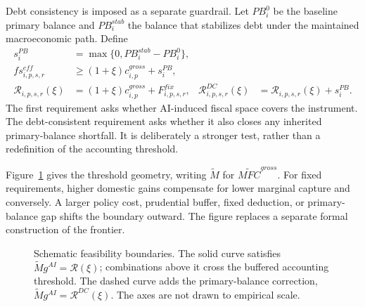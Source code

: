 Debt consistency is imposed as a separate guardrail. Let $PB_i^0$ be the baseline primary balance and $PB_i^{stab}$ the balance that stabilizes debt under the maintained macroeconomic path. Define
\begin{align}
  s_i^{PB}
    &=\max\{0,PB_i^{stab}-PB_i^0\},
    \label{eq:primary_balance_gap_clean}\\
  fs^{eff}_{i,p,s,r}
    &\geq(1+\xi)c^{gross}_{i,p}+s_i^{PB},
    \label{eq:debt_guardrail_clean}\\
  \mathcal R_{i,p,s,r}(\xi)
    &=(1+\xi)c^{gross}_{i,p}+F^{fix}_{i,p,s,r},
  &\mathcal R^{DC}_{i,p,s,r}(\xi)
    &=\mathcal R_{i,p,s,r}(\xi)+s_i^{PB}.
    \label{eq:requirements_clean}
\end{align}
The first requirement asks whether AI-induced fiscal space covers the instrument. The debt-consistent requirement asks whether it also closes any inherited primary-balance shortfall. It is deliberately a stronger test, rather than a redefinition of the accounting threshold.

Figure~\ref{fig:frontier_clean} gives the threshold geometry, writing $\widetilde M$ for $\widetilde{MFC}^{gross}$. For fixed requirements, higher domestic gains compensate for lower marginal capture and conversely. A larger policy cost, prudential buffer, fixed deduction, or primary-balance gap shifts the boundary outward. The figure replaces a separate formal construction of the frontier.

\begin{figure}[H]
\centering
{}
\caption{Schematic feasibility boundaries. The solid curve satisfies
$\widetilde M g^{AI}=\mathcal R(\xi)$; combinations above it cross the buffered accounting threshold. The dashed curve adds the primary-balance correction, $\widetilde M g^{AI}=\mathcal R^{DC}(\xi)$. The axes are not drawn to empirical scale.}
\label{fig:frontier_clean}
\end{figure}

